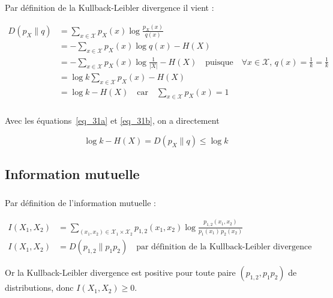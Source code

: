 \documentclass[12pt,a4paper,onecolumn]{article}
\begin{document}
Par définition de la Kullback-Leibler divergence il vient :

\begin{equation}
	\begin{split}
		D(p_X \parallel q) &= \sum_{x \in \mathcal{X}}p_X(x)\log\frac{p_X(x)}{q(x)}\\
		&= -\sum_{x \in \mathcal{X}}p_X(x)\log q(x) - H(X) \\
		&= -\sum_{x \in \mathcal{X}}p_X(x)\log\frac{1}{|X|} - H(X) \quad \text{puisque} \quad \forall x \in \mathcal{X},\, q(x) = \frac{1}{k} = \frac{1}{k}\\
		&= \log k\sum_{x \in \mathcal{X}}p_X(x) - H(X)\\
		&= \log k - H(X) \quad \text{car} \quad \sum_{x \in \mathcal{X}}p_X(x) = 1
	\end{split}
	\label{eq_31b}
\end{equation}

\subsubsection{}
Avec les équations~\eqref{eq_31a} et \eqref{eq_31b}, on a directement

\begin{equation}
	\log k - H(X) = D(p_X \parallel q) \leq \log k
\end{equation}

\subsection{Information mutuelle}

\subsubsection{}
Par définition de l'information mutuelle :

\begin{equation}
	\begin{split}
		I(X_1, X_2) &= \sum_{(x_1,x_2)\in\mathcal{X}_1\times\mathcal{X}_2} p_{1, 2}(x_1,x_2) \log \frac{p_{1, 2}(x_1,x_2)}{p_1(x_1)\,p_2(x_2)}\\
		I(X_1, X_2) &= D(p_{1, 2} \parallel p_1p_2) \quad \text{par définition de la Kullback-Leibler divergence}
	\end{split}
\end{equation}

Or la Kullback-Leibler divergence est positive pour toute paire \((p_{1, 2}, p_1p_2)\) de distributions, donc \(I(X_1, X_2) \geq 0\).
\end{document}
